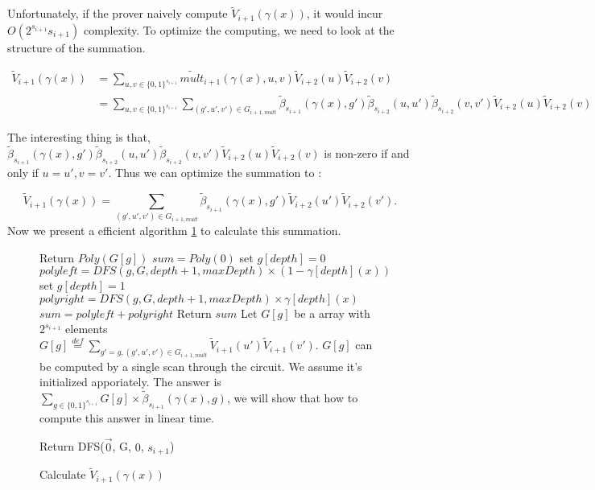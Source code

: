 Unfortunately, if the prover naively compute $\tilde{V}_{i+1}(\gamma(x))$, it would incur $O(2^{s_{i+1}}s_{i+1})$ complexity. To optimize the computing, we need to look at the structure of the summation. 

\begin{align*}
\tilde{V}_{i+1}(\gamma(x))&=\sum_{u, v \in \{0, 1\}^{s_{i+1}}}\tilde{mult}_{i+1}(\gamma(x), u, v)\tilde{V}_{i+2}(u)\tilde{V}_{i+2}(v)\\
&=\sum_{u, v\in \{0, 1\}^{s_{i+1}}}\sum_{(g', u', v') \in G_{i+1, mult}}\tilde{\beta}_{s_{i+1}}(\gamma(x), g')\tilde{\beta}_{s_{i+2}}(u, u')\tilde{\beta}_{s_{i+2}}(v, v')\tilde{V}_{i+2}(u)\tilde{V}_{i+2}(v)
\end{align*}

The interesting thing is that, $\tilde{\beta}_{s_{i+1}}(\gamma(x), g')\tilde{\beta}_{s_{i+2}}(u, u')\tilde{\beta}_{s_{i+2}}(v, v')\tilde{V}_{i+2}(u)\tilde{V}_{i+2}(v)$ is non-zero if and only if $u=u', v=v'$. Thus we can optimize the summation to :

$$\tilde{V}_{i+1}(\gamma(x))=\sum_{(g', u', v') \in G_{i+1, mult}}\tilde{\beta}_{s_{i+1}}(\gamma(x), g')\tilde{V}_{i+2}(u')\tilde{V}_{i+2}(v').$$ Now we present a efficient algorithm \ref{alg::comb} to calculate this summation.

\begin{figure}[p]
\begin{algorithm}[H]
\label{alg::comb}
\caption{Calculate $\tilde{V}_{i+1}(\gamma(x))$}
\begin{algorithmic}[1]
		\State Return $Poly(G[g])$
	\Else
		\State $sum = Poly(0)$
		\State set $g[depth]=0$
		\State $polyleft = DFS(g, G, depth + 1, maxDepth) \times (1-\gamma[depth](x))$
		\State set $g[depth]=1$
		\State $polyright = DFS(g, G, depth + 1, maxDepth) \times \gamma[depth](x)$
		\State $sum = polyleft + polyright$
		\State Return $sum$
	\EndIf
\EndProcedure
{}
\State Let $G[g]$ be a array with $2^{s_{i+1}}$ elements
\State $G[g]\overset{def}{=}\sum_{g'=g, (g', u', v')\in G_{i+1, mult}}\tilde{V}_{i+1}(u')\tilde{V}_{i+1}(v')$.
\State $G[g]$ can be computed by a single scan through the circuit. We assume it's initialized apporiately.
\State The answer is $\sum_{g \in \{0, 1\}^{s_{i+1}}}G[g]\times \tilde{\beta}_{s_{i+1}}(\gamma(x), g)$, we will show that how to compute this answer in linear time.

\State Return {\sf DFS}($\vec{0}$, G, $0$, $s_{i+1}$)
\EndProcedure
\end{algorithmic}
\end{algorithm}
\end{figure}
